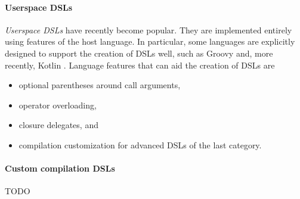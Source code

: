 \paragraph{Userspace DSLs}
\textit{Userspace DSLs} have recently become popular.
They are implemented entirely using features of the host language.
In particular, some languages are explicitly designed to
support the creation of DSLs well, such as
Groovy \autocite{GroovyDslDoc}
and, more recently,
Kotlin \autocite{KotlinTypeSafeBuilderDoc}.
Language features that can aid the creation of DSLs are
\autocite{GroovyDslDoc}
\begin{itemize}
  \item optional parentheses around call arguments,
  \item operator overloading,
  \item closure delegates, and
  \item compilation customization for advanced DSLs of the last category.
\end{itemize}

\paragraph{Custom compilation DSLs}
TODO
